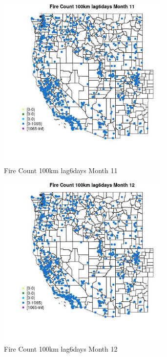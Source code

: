 \begin{figure} 
\centering  
\includegraphics[width=0.77\textwidth]{Code_Outputs/Report_ML_input_PM25_Step4_part_f_de_duplicated_aves_prioritize_24hr_obswNAs_MapObsMo11Fire_Count_100km_lag6days.jpg} 
\caption{\label{fig:Report_ML_input_PM25_Step4_part_f_de_duplicated_aves_prioritize_24hr_obswNAsMapObsMo11Fire_Count_100km_lag6days}Fire Count 100km lag6days Month 11} 
\end{figure} 
 

\begin{figure} 
\centering  
\includegraphics[width=0.77\textwidth]{Code_Outputs/Report_ML_input_PM25_Step4_part_f_de_duplicated_aves_prioritize_24hr_obswNAs_MapObsMo12Fire_Count_100km_lag6days.jpg} 
\caption{\label{fig:Report_ML_input_PM25_Step4_part_f_de_duplicated_aves_prioritize_24hr_obswNAsMapObsMo12Fire_Count_100km_lag6days}Fire Count 100km lag6days Month 12} 
\end{figure} 
 

